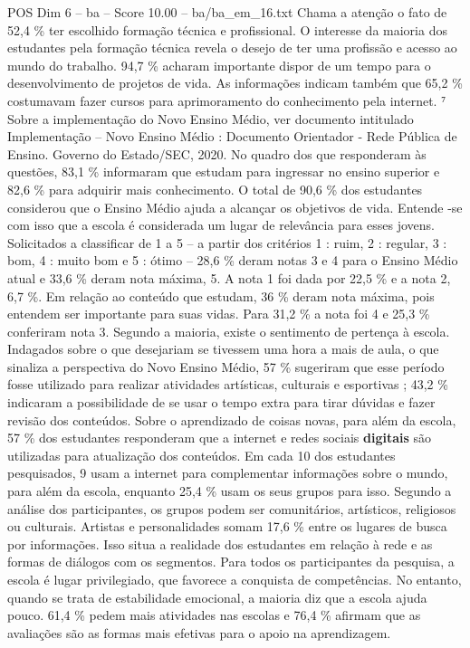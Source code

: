 \begin{textsample}{POS Dim 6 – ba – Score 10.00 – ba/ba\_em\_16.txt}
Chama a atenção o fato de 52,4 \% ter escolhido formação técnica e profissional.
O interesse da maioria dos estudantes pela formação técnica revela o desejo de ter uma profissão e acesso ao mundo do trabalho. 94,7 \% acharam importante dispor de um tempo para o desenvolvimento de projetos de vida.
As informações indicam também que 65,2 \% costumavam fazer cursos para aprimoramento do conhecimento pela internet. ⁷ Sobre a implementação do Novo Ensino Médio, ver documento intitulado Implementação – Novo Ensino Médio : Documento Orientador - Rede Pública de Ensino.
Governo do Estado/SEC, 2020.
No quadro dos que responderam às questões, 83,1 \% informaram que estudam para ingressar no ensino superior e 82,6 \% para adquirir mais conhecimento.
O total de 90,6 \% dos estudantes considerou que o Ensino Médio ajuda a alcançar os objetivos de vida.
Entende -se com isso que a escola é considerada um lugar de relevância para esses jovens.
Solicitados a classificar de 1 a 5 – a partir dos critérios 1 : ruim, 2 : regular, 3 : bom, 4 : muito bom e 5 : ótimo – 28,6 \% deram notas 3 e 4 para o Ensino Médio atual e 33,6 \% deram nota máxima, 5.
A nota 1 foi dada por 22,5 \% e a nota 2, 6,7 \%.
Em relação ao conteúdo que estudam, 36 \% deram nota máxima, pois entendem ser importante para suas vidas.
Para 31,2 \% a nota foi 4 e 25,3 \% conferiram nota 3.
Segundo a maioria, existe o sentimento de pertença à escola.
Indagados sobre o que desejariam se tivessem uma hora a mais de aula, o que sinaliza a perspectiva do Novo Ensino Médio, 57 \% sugeriram que esse período fosse utilizado para realizar atividades artísticas, culturais e esportivas ; 43,2 \% indicaram a possibilidade de se usar o tempo extra para tirar dúvidas e fazer revisão dos conteúdos.
Sobre o aprendizado de coisas novas, para além da escola, 57 \% dos estudantes responderam que a internet e redes sociais \textbf{digitais} são utilizadas para atualização dos conteúdos.
Em cada 10 dos estudantes pesquisados, 9 usam a internet para complementar informações sobre o mundo, para além da escola, enquanto 25,4 \% usam os seus grupos para isso.
Segundo a análise dos participantes, os grupos podem ser comunitários, artísticos, religiosos ou culturais.
Artistas e personalidades somam 17,6 \% entre os lugares de busca por informações.
Isso situa a realidade dos estudantes em relação à rede e as formas de diálogos com os segmentos.
Para todos os participantes da pesquisa, a escola é lugar privilegiado, que favorece a conquista de competências.
No entanto, quando se trata de estabilidade emocional, a maioria diz que a escola ajuda pouco. 61,4 \% pedem mais atividades nas escolas e 76,4 \% afirmam que as avaliações são as formas mais efetivas para o apoio na aprendizagem.

\end{textsample}
